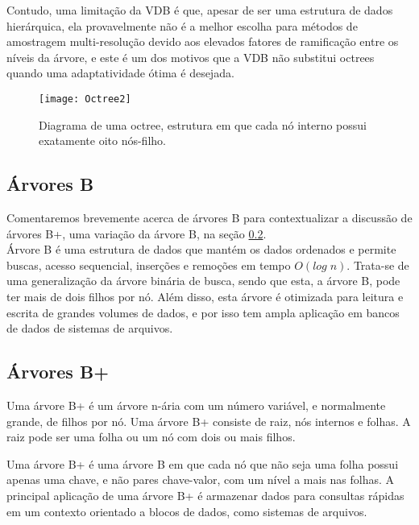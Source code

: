 Contudo, uma limitação da VDB é que, apesar de ser uma estrutura de dados hierárquica, ela provavelmente não é a melhor escolha para métodos de amostragem multi-resolução devido aos elevados fatores de ramificação entre os níveis da árvore, e este é um dos motivos que a VDB não substitui octrees quando uma adaptatividade ótima é desejada.

\begin{figure}[!htb]
\center
\texttt{[image: Octree2]}
\caption{Diagrama de uma octree, estrutura em que cada nó interno possui exatamente oito nós-filho.}
\label{octree}
\end{figure}


\subsection{Árvores B}
Comentaremos brevemente acerca de árvores B para contextualizar a discussão de árvores B+, uma variação da árvore B, na seção \ref{bplus_trees}. \\

Árvore B é uma estrutura de dados que mantém os dados ordenados e permite buscas, acesso sequencial, inserções e remoções em tempo $O(log\;n)$. Trata-se de uma generalização da árvore binária de busca, sendo que esta, a árvore B, pode ter mais de dois filhos por nó. Além disso, esta árvore é otimizada para leitura e escrita de grandes volumes de dados, e por isso tem ampla aplicação em bancos de dados de sistemas de arquivos.

\subsection{Árvores B+}
\label{bplus_trees}
Uma árvore B+ é um árvore n-ária com um número variável, e normalmente grande, de filhos por nó. Uma árvore B+ consiste de raiz, nós internos e folhas. A raiz pode ser uma folha ou um nó com dois ou mais filhos.

Uma árvore B+ é uma árvore B em que cada nó que não seja uma folha possui apenas uma chave, e não pares chave-valor, com um nível a mais nas folhas. A principal aplicação de uma árvore B+ é armazenar dados para consultas rápidas em um contexto orientado a blocos de dados, como sistemas de arquivos.\\

